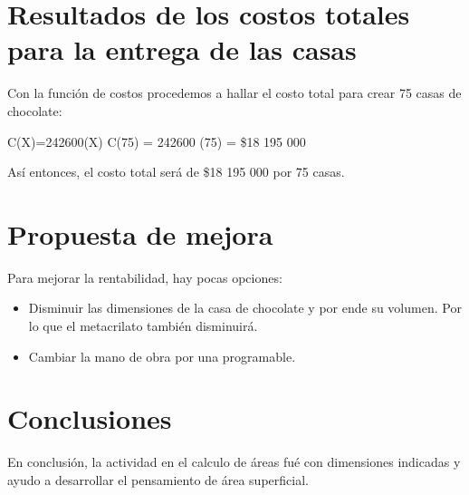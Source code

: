 \documentclass{article}
\theoremstyle{mytheoremstyle}
\theoremstyle{mytheoremstyle}
\theoremstyle{myproblemstyle}
\begin{document}
\section{Resultados de los costos totales para la entrega de las casas}
Con la función de costos procedemos a hallar el costo total para crear 75 casas de chocolate: 

C(X)=242600(X)
C(75) = 242600 (75) = \$18 195 000

Así entonces, el costo total será de \$18 195 000 por 75 casas.
\section{Propuesta de mejora}
Para mejorar la rentabilidad, hay pocas opciones:
\begin{itemize}
    \item Disminuir las dimensiones de la casa de chocolate y por ende su volumen. Por lo que el metacrilato también disminuirá.
    \item Cambiar la mano de obra por una programable.
\end{itemize}
\section{Conclusiones}
En conclusión, la actividad en el calculo de áreas fué con dimensiones indicadas y ayudo a desarrollar el pensamiento de área superficial.


\nocite{*}

\end{document}
